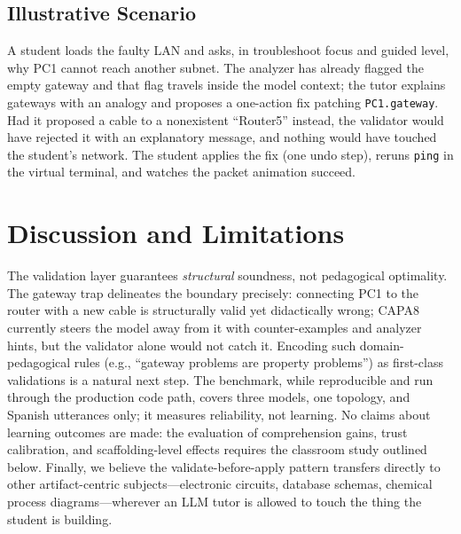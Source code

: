 \documentclass[conference,a4paper]{IEEEtran}
\begin{document}
\subsection{Illustrative Scenario}
A student loads the faulty LAN and asks, in troubleshoot focus and guided level, why PC1 cannot reach another subnet. The analyzer has already flagged the empty gateway and that flag travels inside the model context; the tutor explains gateways with an analogy and proposes a one-action fix patching \texttt{PC1.gateway}. Had it proposed a cable to a nonexistent ``Router5'' instead, the validator would have rejected it with an explanatory message, and nothing would have touched the student's network. The student applies the fix (one undo step), reruns \texttt{ping} in the virtual terminal, and watches the packet animation succeed.

\section{Discussion and Limitations}
The validation layer guarantees \emph{structural} soundness, not pedagogical optimality. The gateway trap delineates the boundary precisely: connecting PC1 to the router with a new cable is structurally valid yet didactically wrong; CAPA8 currently steers the model away from it with counter-examples and analyzer hints, but the validator alone would not catch it. Encoding such domain-pedagogical rules (e.g., ``gateway problems are property problems'') as first-class validations is a natural next step. The benchmark, while reproducible and run through the production code path, covers three models, one topology, and Spanish utterances only; it measures reliability, not learning. No claims about learning outcomes are made: the evaluation of comprehension gains, trust calibration, and scaffolding-level effects requires the classroom study outlined below. Finally, we believe the validate-before-apply pattern transfers directly to other artifact-centric subjects---electronic circuits, database schemas, chemical process diagrams---wherever an LLM tutor is allowed to touch the thing the student is building.
\end{document}
